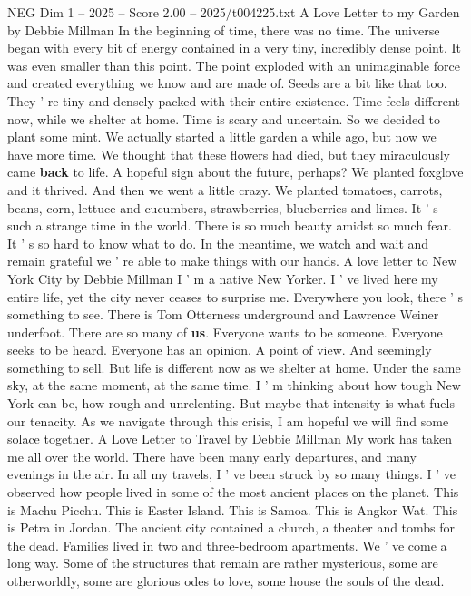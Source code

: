\begin{textsample}{NEG Dim 1 – 2025 – Score 2.00 – 2025/t004225.txt}  \label{ex:f1_neg_002}
A Love Letter to my Garden by Debbie Millman In the beginning of time, there was no time.
The universe began with every bit of energy contained in a very tiny, incredibly dense point.
It was even smaller than this point.
The point exploded with an unimaginable force and created everything we know and are made of.
Seeds are a bit like that too.
They ' re tiny and densely packed with their entire existence.
Time feels different now, while we shelter at home.
Time is scary and uncertain.
So we decided to plant some mint.
We actually started a little garden a while ago, but now we have more time.
We thought that these flowers had died, but they miraculously came \textbf{back} to life.
A hopeful sign about the future, perhaps?
We planted foxglove and it thrived.
And then we went a little crazy.
We planted tomatoes, carrots, beans, corn, lettuce and cucumbers, strawberries, blueberries and limes.
It ' s such a strange time in the world.
There is so much beauty amidst so much fear.
It ' s so hard to know what to do.
In the meantime, we watch and wait and remain grateful we ' re able to make things with our hands.
A love letter to New York City by Debbie Millman I ' m a native New Yorker.
I ' ve lived here my entire life, yet the city never ceases to surprise me.
Everywhere you look, there ' s something to see.
There is Tom Otterness underground and Lawrence Weiner underfoot.
There are so many of \textbf{us}.
Everyone wants to be someone.
Everyone seeks to be heard.
Everyone has an opinion, A point of view.
And seemingly something to sell.
But life is different now as we shelter at home.
Under the same sky, at the same moment, at the same time.
I ' m thinking about how tough New York can be, how rough and unrelenting.
But maybe that intensity is what fuels our tenacity.
As we navigate through this crisis, I am hopeful we will find some solace together.
A Love Letter to Travel by Debbie Millman My work has taken me all over the world.
There have been many early departures, and many evenings in the air.
In all my travels, I ' ve been struck by so many things.
I ' ve observed how people lived in some of the most ancient places on the planet.
This is Machu Picchu.
This is Easter Island.
This is Samoa.
This is Angkor Wat.
This is Petra in Jordan.
The ancient city contained a church, a theater and tombs for the dead.
Families lived in two and three-bedroom apartments.
We ' ve come a long way.
Some of the structures that remain are rather mysterious, some are otherworldly, some are glorious odes to love, some house the souls of the dead.

\end{textsample}
